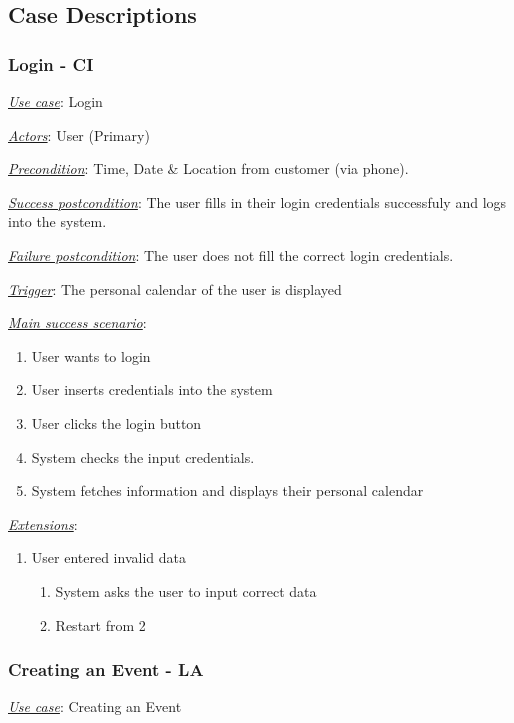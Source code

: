 \documentclass[a4paper]{article}
\begin{document}
\subsection{Case Descriptions} %
\subsubsection{Login - CI}
\underline{\textit{Use case}}: Login

\underline{\textit{Actors}}: User (Primary)

\underline{\textit{Precondition}}: Time, Date \& Location from customer (via phone).

\underline{\textit{Success postcondition}}: The user fills in their login credentials successfuly and logs into the system.

\underline{\textit{Failure postcondition}}: The user does not fill the correct login credentials.

\underline{\textit{Trigger}}: The personal calendar of the user is displayed

\underline{\textit{Main success scenario}}: 
\begin{enumerate}[leftmargin = 3em]
    \item User wants to login
    \item User inserts credentials into the system
    \item User clicks the login button
    \item System checks the input credentials.
    \item System fetches information and displays their personal calendar
\end{enumerate} 

\underline{\textit{Extensions}}:
\begin{enumerate}[label=3\alph*, leftmargin = 3em]
    \item User entered invalid data \begin{enumerate}[label=\arabic*.]
        \item System asks the user to input correct data
        \item Restart from 2
    \end{enumerate}
\end{enumerate}

\subsubsection{Creating an Event - LA}
\underline{\textit{Use case}}: Creating an Event
\end{document}
